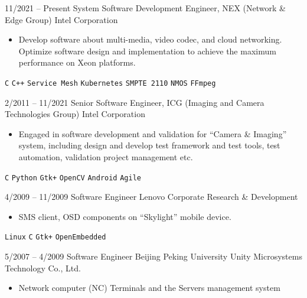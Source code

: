 \documentclass[9pt]{developercv} %
\begin{document}
\begin{entrylist}
	\entry
        {11/2021 -- Present}
		{System Software Development Engineer, NEX (Network \& Edge Group)}
		{Intel Corporation}
		{\vspace{-10pt}
        \begin{itemize}[noitemsep,topsep=0pt,parsep=0pt,partopsep=0pt, leftmargin=-1pt]
            \item Develop software about multi-media, video codec, and cloud networking.
            Optimize software design and implementation to achieve the maximum performance on Xeon platforms.
        \end{itemize} 
        \texttt{C} \slashsep \texttt{C++} \slashsep \texttt{Service Mesh} \slashsep \texttt{Kubernetes} \slashsep \texttt{SMPTE 2110}  \slashsep \texttt{NMOS} \slashsep \texttt{FFmpeg}}
	\entry
		{2/2011 -- 11/2021}
		{Senior Software Engineer, ICG (Imaging and Camera Technologies Group)}
		{Intel Corporation}
		{\vspace{-10pt}
        \begin{itemize}[noitemsep,topsep=0pt,parsep=0pt,partopsep=0pt, leftmargin=-1pt]
            \item Engaged in software development and validation for “Camera \& Imaging” system, including design and develop test framework and test tools, test automation, validation project management etc.
        \end{itemize} 
        \texttt{C} \slashsep \texttt{Python} \slashsep \texttt{Gtk+} \slashsep \texttt{OpenCV} \slashsep \texttt{Android} \slashsep \texttt{Agile}}
	\entry
		{4/2009 -- 11/2009}
		{Software Engineer}
		{Lenovo Corporate Research \& Development}
		{\vspace{-10pt}
        \begin{itemize}[noitemsep,topsep=0pt,parsep=0pt,partopsep=0pt, leftmargin=-1pt]
            \item SMS client, OSD components on “Skylight” mobile device.
        \end{itemize} 
        \texttt{Linux} \slashsep \texttt{C} \slashsep \texttt{Gtk+} \slashsep \texttt{OpenEmbedded}}
	\entry
		{5/2007 -- 4/2009}
		{Software Engineer}
		{Beijing Peking University Unity Microsystems Technology Co., Ltd.}
		{\vspace{-10pt}
        \begin{itemize}[noitemsep,topsep=0pt,parsep=0pt,partopsep=0pt, leftmargin=-1pt]
            \item Network computer (NC) Terminals and the Servers management system

\end{itemize}}
\end{entrylist}
\end{document}

